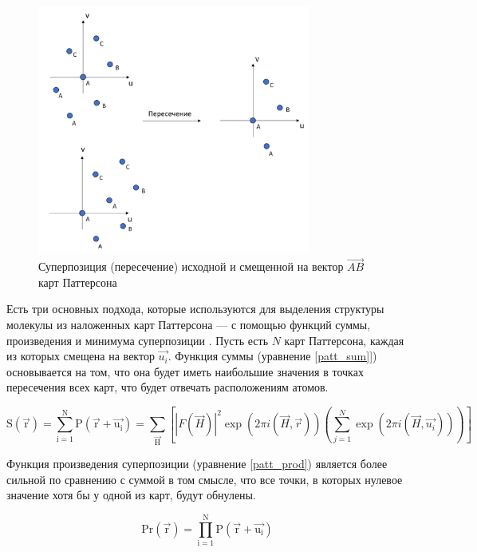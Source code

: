 \begin{figure}[H]
	\centering
	\includegraphics[width=0.8\textwidth]{figures/patt_superposition.png}\hfill
	\caption{Суперпозиция (пересечение) исходной и смещенной на вектор $\overrightarrow{AB}$ карт Паттерсона}
	\label{patt_superposition}
\end{figure}

Есть три основных подхода, которые используются для выделения структуры молекулы из наложенных карт Паттерсона --- с помощью функций суммы, произведения и минимума суперпозиции \cite{rossmann_patterson_2001}. Пусть есть $N$ карт Паттерсона, каждая из которых смещена на вектор $\overrightarrow{u_i}$. Функция суммы (уравнение \ref{patt_sum}]) основывается на том, что она будет иметь наибольшие значения в точках пересечения всех карт, что будет отвечать расположениям атомов.

\begin{equation}\label{patt_sum}
	\mathrm{S(\overrightarrow{r}) = \sum\limits_{i=1}^N P(\overrightarrow{r}+\overrightarrow{u_i}) = \sum_{\overrightarrow{H}}}\left[|F(\overrightarrow{H})|^2 \exp (2\pi i (\overrightarrow{H}, \overrightarrow{r}))\left(\sum\limits_{j=1}^N\exp(2\pi i (\overrightarrow{H}, \overrightarrow{u_i}))\right)\right]
\end{equation}

Функция произведения суперпозиции (уравнение \ref{patt_prod}) является более сильной по сравнению с суммой в том смысле, что все точки, в которых нулевое значение хотя бы у одной из карт, будут обнулены.

\begin{equation}\label{patt_prod}
	\mathrm{Pr(\overrightarrow{r}) = \prod\limits_{i=1}^N P(\overrightarrow{r}+\overrightarrow{u_i})} 
\end{equation}
	

